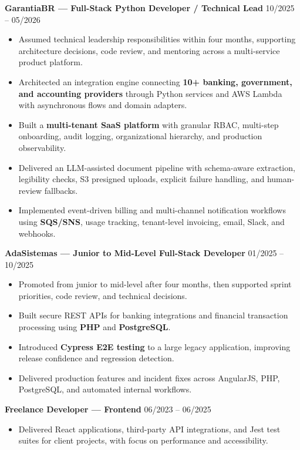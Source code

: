 \documentclass[a4paper,10pt]{article}
\begin{document}
\newpage
\textbf{GarantiaBR — Full-Stack Python Developer / Technical Lead} \hfill 10/2025 -- 05/2026
\begin{itemize}[leftmargin=*, itemsep=2pt]
    \item Assumed technical leadership responsibilities within four months, supporting architecture decisions, code review, and mentoring across a multi-service product platform.
    \item Architected an integration engine connecting \textbf{10+ banking, government, and accounting providers} through Python services and AWS Lambda with asynchronous flows and domain adapters.
    \item Built a \textbf{multi-tenant SaaS platform} with granular RBAC, multi-step onboarding, audit logging, organizational hierarchy, and production observability.
    \item Delivered an LLM-assisted document pipeline with schema-aware extraction, legibility checks, S3 presigned uploads, explicit failure handling, and human-review fallbacks.
    \item Implemented event-driven billing and multi-channel notification workflows using \textbf{SQS/SNS}, usage tracking, tenant-level invoicing, email, Slack, and webhooks.
\end{itemize}

\textbf{AdaSistemas — Junior to Mid-Level Full-Stack Developer} \hfill 01/2025 -- 10/2025
\begin{itemize}[leftmargin=*, itemsep=2pt]
    \item Promoted from junior to mid-level after four months, then supported sprint priorities, code review, and technical decisions.
    \item Built secure REST APIs for banking integrations and financial transaction processing using \textbf{PHP} and \textbf{PostgreSQL}.
    \item Introduced \textbf{Cypress E2E testing} to a large legacy application, improving release confidence and regression detection.
    \item Delivered production features and incident fixes across AngularJS, PHP, PostgreSQL, and automated internal workflows.
\end{itemize}

\textbf{Freelance Developer — Frontend} \hfill 06/2023 -- 06/2025
\begin{itemize}[leftmargin=*, itemsep=2pt]
    \item Delivered React applications, third-party API integrations, and Jest test suites for client projects, with focus on performance and accessibility.
\end{itemize}
\end{document}
